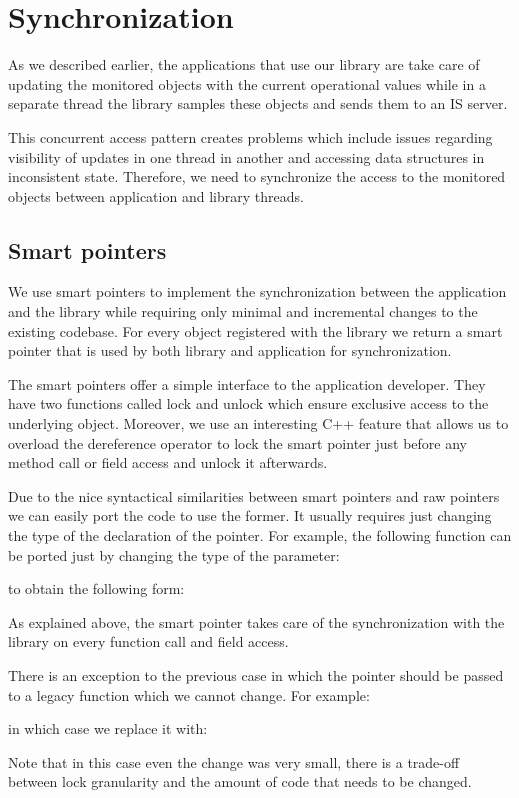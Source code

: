 \chapter{Synchronization} %
\label{Capitolul5}


As we described earlier, the applications that use our library are take care of updating the monitored objects with the current operational values while in a separate thread the library samples these objects and sends them to an IS server. 

This concurrent access pattern creates problems which include issues regarding visibility of updates in one thread in another and accessing data structures in inconsistent state. Therefore, we need to synchronize the access to the monitored objects between application and library 
threads.

\section*{Smart pointers}

We use smart pointers to implement the synchronization between the application and the library while requiring only minimal and incremental changes to the existing codebase. For every object registered with the library we return a smart pointer that is used by both library and application for synchronization. 

The smart pointers offer a simple interface to the application developer. They have two functions called lock and unlock which ensure exclusive access to the underlying object. Moreover, we use an interesting C++ feature \citep{andrei2001modern} that allows us to overload the dereference operator to lock the smart pointer just before any method call or field access and unlock it afterwards.

Due to the nice syntactical similarities between smart pointers and raw pointers we can easily port the code to use the former. It usually requires just changing the type of the declaration of the pointer. For example, the following function can be ported just by changing the type of the parameter:

to obtain the following form:

As explained above, the smart pointer takes care of the synchronization with the library on every function call and field access.

There is an exception to the previous case in which the pointer should be passed to a legacy function which we cannot change. For example:

in which case we replace it with:

Note that in this case even the change was very small, there is a trade-off between lock granularity and the amount of code that needs to be changed. 


